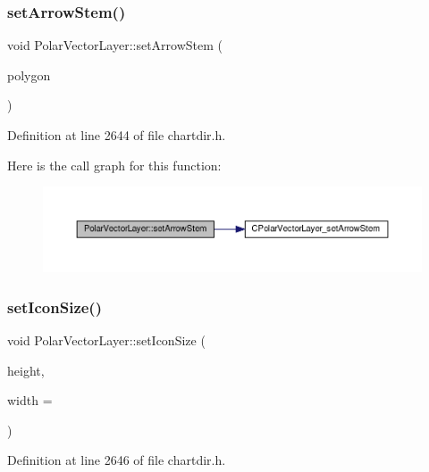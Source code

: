 \subsubsection{\texorpdfstring{set\+Arrow\+Stem()}{setArrowStem()}}
{\footnotesize\ttfamily void Polar\+Vector\+Layer\+::set\+Arrow\+Stem (\begin{DoxyParamCaption}\item[{\hyperlink{class_int_array}{Int\+Array}}]{polygon }\end{DoxyParamCaption})\hspace{0.3cm}{\ttfamily [inline]}}



Definition at line 2644 of file chartdir.\+h.

Here is the call graph for this function\+:
\nopagebreak
\begin{figure}[H]
\begin{center}
\leavevmode
\includegraphics[width=350pt]{class_polar_vector_layer_a7b3681c192109aa5d4085d625c4bee7c_cgraph}
\end{center}
\end{figure}
\mbox{\label{class_polar_vector_layer_a37700e57ce3ce0b6deda4782112b56c9}} 
\subsubsection{\texorpdfstring{set\+Icon\+Size()}{setIconSize()}}
{\footnotesize\ttfamily void Polar\+Vector\+Layer\+::set\+Icon\+Size (\begin{DoxyParamCaption}\item[{int}]{height,  }\item[{int}]{width = {} }\end{DoxyParamCaption})\hspace{0.3cm}{\ttfamily [inline]}}



Definition at line 2646 of file chartdir.\+h.

